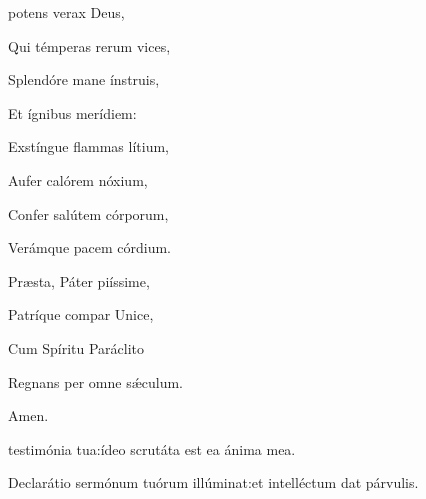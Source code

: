




\begin{multicols}{2}



\thispagestyle{plain}


\vspace{-0.2cm}


\Hymne{}

\setlength{\leftskip}{0cm}
 potens verax Deus,

\Hymne{}

Qui témperas rerum vices,

Splendóre mane ínstruis,

Et ígnibus merídiem\thinspace:

\vspace{0.3cm}

Exstíngue flammas lítium,

Aufer calórem nóxium,

Confer salútem córporum,

Verámque pacem córdium.

\vspace{0.3cm}

Præsta, Páter piíssime,

Patríque compar Unice,

Cum Spíritu Paráclito

Regnans per omne sǽculum.

\vspace{-0.5cm}

\begin{flushright}
Amen.
\end{flushright}

\vspace{-0.5cm}




\Normal

 testimónia tua\thinspace:\GreStarNbsp ídeo scrutáta est ea ánima mea.

Declarátio sermónum tuórum illúminat\thinspace:\GreStarNbsp et intelléctum dat párvulis.


\end{multicols}
